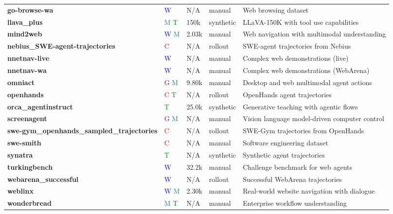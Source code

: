 \begin{table}[htbp]
\begin{tabular}{p{3cm}p{2cm}p{1.5cm}p{1.5cm}p{4cm}}
\textbf{go-browse-wa} & \textcolor{blue}{W} & N/A & manual & Web browsing dataset \\
\textbf{llava\_plus} \cite{llava_plus_learning__2311_05437} & \textcolor{teal}{M} \textcolor{green}{T} & 150k & synthetic & LLaVA-150K with tool use capabilities \\
\textbf{mind2web} \cite{mind2web_towards_a_g_2306_06070} & \textcolor{blue}{W} \textcolor{teal}{M} & 2.03k & manual & Web navigation with multimodal understanding \\
\textbf{nebius\_SWE-agent-trajectories} & \textcolor{red}{C} & N/A & rollout & SWE-agent trajectories from Nebius \\
\textbf{nnetnav-live} \cite{nnetscape_navigator__2410_02907} & \textcolor{blue}{W} & N/A & manual & Complex web demonstrations (live) \\
\textbf{nnetnav-wa} \cite{nnetscape_navigator__2410_02907} & \textcolor{blue}{W} & N/A & manual & Complex web demonstrations (WebArena) \\
\textbf{omniact} \cite{omniact_a_dataset_an_2402_17553} & \textcolor{purple}{G} \textcolor{teal}{M} & 9.80k & manual & Desktop and web multimodal agent actions \\
\textbf{openhands} & \textcolor{red}{C} \textcolor{green}{T} & N/A & rollout & OpenHands agent trajectories \\
\textbf{orca\_agentinstruct} \cite{agentinstruct_toward_2407_03502} & \textcolor{green}{T} & 25.0k & synthetic & Generative teaching with agentic flows \\
\textbf{screenagent} \cite{screenagent_a_vision_2402_07945} & \textcolor{purple}{G} \textcolor{teal}{M} & N/A & manual & Vision language model-driven computer control \\
\textbf{swe-gym\_openhands\_sampled\_trajectories} & \textcolor{red}{C} & N/A & rollout & SWE-Gym trajectories from OpenHands \\
\textbf{swe-smith} & \textcolor{red}{C} & N/A & manual & Software engineering dataset \\
\textbf{synatra} & \textcolor{green}{T} & N/A & synthetic & Synthetic agent trajectories \\
\textbf{turkingbench} \cite{turkingbench_a_chall_2403_11905} & \textcolor{blue}{W} & 32.2k & manual & Challenge benchmark for web agents \\
\textbf{webarena\_successful} & \textcolor{blue}{W} & N/A & rollout & Successful WebArena trajectories \\
\textbf{weblinx} \cite{weblinx_real_world_w_2402_05930} & \textcolor{blue}{W} \textcolor{teal}{M} & 2.30k & manual & Real-world website navigation with dialogue \\
\textbf{wonderbread} \cite{do_multimodal_founda_2401_09553} & \textcolor{teal}{M} \textcolor{green}{T} & N/A & manual & Enterprise workflow understanding \\
\bottomrule
\end{tabular}
\end{table}
